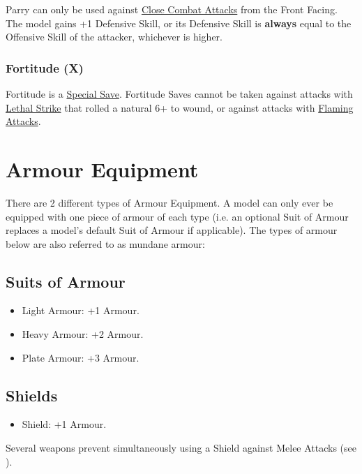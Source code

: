 Parry can only be used against \hyperref[melee_attacks]{Close Combat Attacks} from the Front Facing. The model gains +1 Defensive Skill, or its Defensive Skill is \textbf{always} equal to the Offensive Skill of the attacker, whichever is higher.

\subsubsection{Fortitude (X)}
\label{fortitude}

Fortitude is a \hyperref[special_saves]{Special Save}. Fortitude Saves cannot be taken against attacks with \hyperref[lethal_strike]{Lethal Strike} that rolled a natural 6+ to wound, or against attacks with \hyperref[flaming_attacks]{Flaming Attacks}.

\section{Armour Equipment}
\label{armour_equipment}

There are 2 different types of Armour Equipment. A model can only ever be equipped with one piece of armour of each type (i.e. an optional Suit of Armour replaces a model's default Suit of Armour if applicable). The types of armour below are also referred to as mundane armour:

\subsection{Suits of Armour}

\begin{itemize}[label={-}]
\item Light Armour: +1 Armour.
\item Heavy Armour: +2 Armour.
\item Plate Armour: +3 Armour.
\end{itemize}

\subsection{Shields}

\begin{itemize}[label={-}]
\item Shield: +1 Armour.
\end{itemize}

Several weapons prevent simultaneously using a Shield against Melee Attacks (see ).





